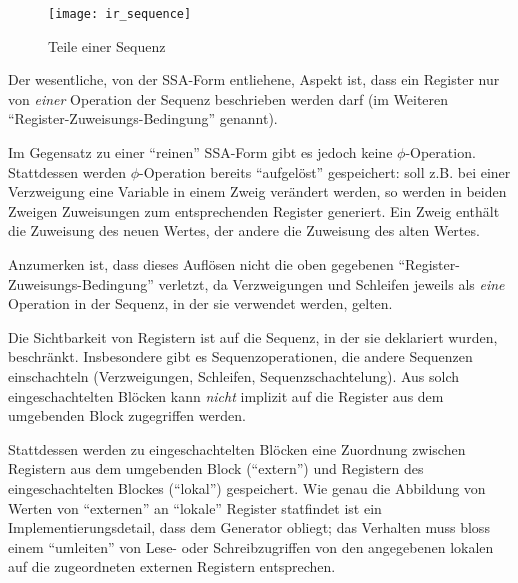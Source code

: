 \documentclass[twoside,a4paper,fleqn,12pt]{book}
\begin{document}
\begin{figure}[h]
   \centering
  \texttt{[image: ir\_sequence]}
  \caption{Teile einer Sequenz}
  \label{fig:ir_sequence}
\end{figure}

Der wesentliche, von der SSA-Form entliehene, Aspekt ist, dass ein Register nur von \emph{einer} Operation der Sequenz beschrieben werden darf
(im Weiteren "`Register-Zuweisungs-Bedingung"' genannt).

Im Gegensatz zu einer "`reinen"' SSA-Form gibt es jedoch keine $\phi$-Operation. Stattdessen werden $\phi$-Operation bereits "`aufgelöst"'
gespeichert: soll z.B. bei einer Verzweigung eine Variable in einem Zweig verändert werden, so werden in beiden Zweigen Zuweisungen zum
entsprechenden Register generiert. Ein Zweig enthält die Zuweisung des neuen Wertes, der andere die Zuweisung des alten Wertes.

Anzumerken ist, dass dieses Auflösen nicht die oben gegebenen "`Register-Zuweisungs-Bedingung"' verletzt, da Verzweigungen und Schleifen
jeweils als \emph{eine} Operation in der Sequenz, in der sie verwendet werden, gelten.

Die Sichtbarkeit von Registern ist auf die Sequenz, in der sie deklariert wurden, beschränkt.
Insbesondere gibt es Sequenzoperationen, die andere Sequenzen einschachteln (Verzweigungen, Schleifen, Sequenzschachtelung).
Aus solch eingeschachtelten Blöcken kann \emph{nicht} implizit auf die Register aus dem umgebenden Block
zugegriffen werden.

Stattdessen werden zu eingeschachtelten Blöcken eine Zuordnung zwischen Registern aus dem umgebenden Block
("`extern"') und
Registern des eingeschachtelten Blockes ("`lokal"') gespeichert.
Wie genau die Abbildung von Werten von "`externen"' an "`lokale"' Register statfindet ist ein Implementierungsdetail, dass dem Generator obliegt;
das Verhalten muss bloss einem "`umleiten"' von Lese- oder Schreibzugriffen von den angegebenen lokalen auf die zugeordneten externen
Registern entsprechen.
\end{document}
